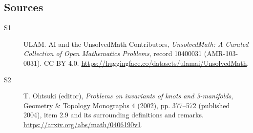 \documentclass[11pt]{article}
\begin{document}
\subsection{Sources}
\begin{description}
\item[\hypertarget{source:10400031:1}{S1}] ULAM. AI and the UnsolvedMath Contributors, \emph{UnsolvedMath: A Curated Collection of Open Mathematics Problems}, record 10400031 (AMR-103-0031). CC BY 4.0. \url{https://huggingface.co/datasets/ulamai/UnsolvedMath}.
\item[\hypertarget{source:10400031:2}{S2}] T. Ohtsuki (editor), \emph{Problems on invariants of knots and 3-manifolds}, Geometry \& Topology Monographs 4 (2002), pp. 377--572 (published 2004), item 2.9 and its surrounding definitions and remarks. \url{https://arxiv.org/abs/math/0406190v1}.
\end{description}
\label{end:10400031}
\end{document}
